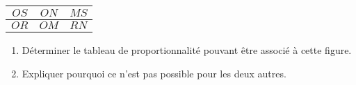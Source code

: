 \begin{exercice*}
\begin{multicols}
{\begin{minipage}{3cm}
\begin{center}
                    \begin{tabular}{c|c|c}
                        $OS$&$ON$&$MS$\\ \hline
                        $OR$&$OM$&$RN$\\
                    \end{tabular}
                \end{center}
            \end{minipage}
        }
        \begin{enumerate}
            \item Déterminer le tableau de proportionnalité pouvant être associé à cette figure.
            \item Expliquer pourquoi ce n'est pas possible pour les deux autres.
        \end{enumerate}
    \end{multicols}
\end{exercice*}

